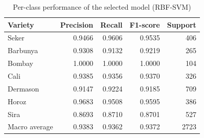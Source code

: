 \begin{table}[htbp]
\centering
\small
\caption{Per-class performance of the selected model (RBF-SVM)}
\label{tab:per_class}
\begin{tabular}{lrrrr}
\toprule
Variety & Precision & Recall & F1-score & Support \\
\midrule
Seker & 0.9466 & 0.9606 & 0.9535 & 406 \\
Barbunya & 0.9308 & 0.9132 & 0.9219 & 265 \\
Bombay & 1.0000 & 1.0000 & 1.0000 & 104 \\
Cali & 0.9385 & 0.9356 & 0.9370 & 326 \\
Dermason & 0.9147 & 0.9224 & 0.9185 & 709 \\
Horoz & 0.9683 & 0.9508 & 0.9595 & 386 \\
Sira & 0.8693 & 0.8710 & 0.8701 & 527 \\
\midrule
Macro average & 0.9383 & 0.9362 & 0.9372 & 2723 \\
\bottomrule
\end{tabular}
\end{table}
